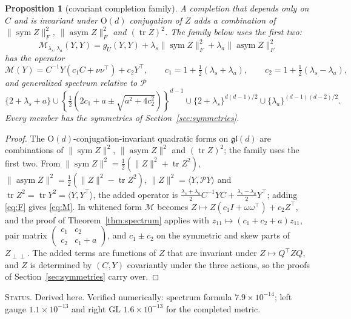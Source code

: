 \documentclass[11pt]{article}
\newtheorem{proposition}[theorem]{Proposition}
\theoremstyle{definition}
\theoremstyle{remark}
\newcommand{\gl}{\mathfrak{gl}}
\newcommand{\GL}{\mathrm{GL}}
\newcommand{\tr}{\operatorname{tr}}
\newcommand{\sym}{\operatorname{sym}}
\newcommand{\asym}{\operatorname{asym}}
\newcommand{\ip}[2]{\langle #1, #2\rangle}
\newcommand{\status}[1]{\par\smallskip\noindent\textsc{Status.} #1\par\smallskip}
\begin{document}
\begin{proposition}[covariant completion family]\label{prop:completion}
A completion that depends only on $C$ and is invariant under $\mathrm{O}(d)$ conjugation of $Z$ adds a combination of $\|\sym Z\|_F^2$, $\|\asym Z\|_F^2$ and $(\tr Z)^2$. The family below uses the first two:
\begin{equation}\label{eq:completion}
\mathcal{M}_{\lambda_s,\lambda_a}(Y,Y)=g_U(Y,Y)+\lambda_s\|\sym Z\|_F^2+\lambda_a\|\asym Z\|_F^2
\end{equation}
has the operator
\begin{equation}\label{eq:M}
\mathcal{M}(Y)=C^{-1}Y(c_1C+\nu\nu^\top)+c_2Y^\top,\qquad c_1=1+\tfrac12(\lambda_s+\lambda_a),\qquad c_2=1+\tfrac12(\lambda_s-\lambda_a),
\end{equation}
and generalized spectrum relative to $\mathcal{P}$
\begin{equation}\label{eq:M-spectrum}
\{2+\lambda_s+a\}\cup\left\{\tfrac12\left(2c_1+a\pm\sqrt{a^2+4c_2^2}\right)\right\}^{d-1}\cup\{2+\lambda_s\}^{d(d-1)/2}\cup\{\lambda_a\}^{(d-1)(d-2)/2}.
\end{equation}
Every member has the symmetries of Section~\ref{sec:symmetries}.
\end{proposition}
\begin{proof}
The $\mathrm{O}(d)$-conjugation-invariant quadratic forms on $\gl(d)$ are combinations of $\|\sym Z\|^2$, $\|\asym Z\|^2$ and $(\tr Z)^2$; the family uses the first two. From $\|\sym Z\|^2=\frac12(\|Z\|^2+\tr Z^2)$, $\|\asym Z\|^2=\frac12(\|Z\|^2-\tr Z^2)$, $\|Z\|^2=\ip{Y}{\mathcal{P}Y}$ and $\tr Z^2=\tr Y^2=\ip{Y}{Y^\top}$, the added operator is $\frac{\lambda_s+\lambda_a}{2}C^{-1}YC+\frac{\lambda_s-\lambda_a}{2}Y^\top$; adding \eqref{eq:F} gives \eqref{eq:M}. In whitened form $\mathcal{M}$ becomes $Z\mapsto Z(c_1I+\omega\omega^\top)+c_2Z^\top$, and the proof of Theorem~\ref{thm:spectrum} applies with $z_{11}\mapsto(c_1+c_2+a)z_{11}$, pair matrix $\begin{pmatrix}c_1&c_2\\c_2&c_1+a\end{pmatrix}$, and $c_1\pm c_2$ on the symmetric and skew parts of $Z_{\perp\perp}$. The added terms are functions of $Z$ that are invariant under $Z\mapsto Q^\top ZQ$, and $Z$ is determined by $(C,Y)$ covariantly under the three actions, so the proofs of Section~\ref{sec:symmetries} carry over.
\end{proof}
\status{Derived here. Verified numerically: spectrum formula $7.9\times10^{-14}$; left gauge $1.1\times10^{-13}$ and right $\GL$ $1.6\times10^{-13}$ for the completed metric.}
\end{document}
